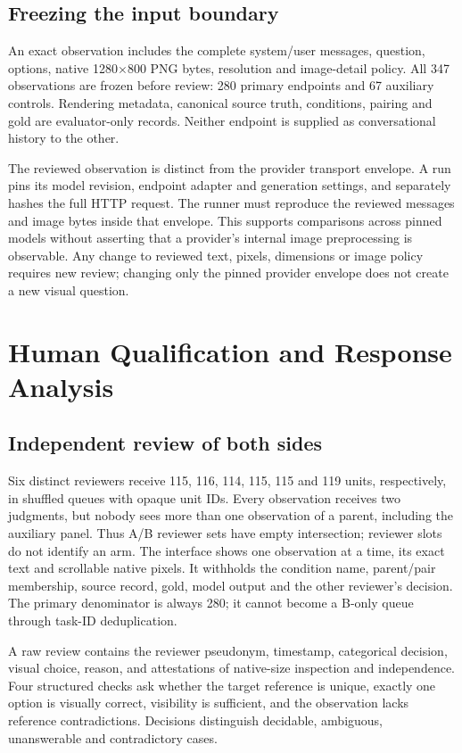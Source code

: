 \documentclass[10pt,twocolumn,letterpaper]{article}
\begin{document}
\subsection{Freezing the input boundary}
An exact observation includes the complete system/user messages,
question, options, native 1280$\times$800 PNG bytes, resolution and
image-detail policy. All 347 observations are frozen before review:
280 primary endpoints and 67 auxiliary controls. Rendering metadata,
canonical source truth, conditions, pairing and gold are evaluator-only
records. Neither endpoint is supplied as conversational history to the
other.

The reviewed observation is distinct from the provider transport
envelope. A run pins its model revision, endpoint adapter and generation
settings, and separately hashes the full HTTP request. The runner must
reproduce the reviewed messages and image bytes inside that envelope.
This supports comparisons across pinned models without asserting
that a provider's internal image preprocessing is observable. Any
change to reviewed text, pixels, dimensions or image policy requires
new review; changing only the pinned provider envelope does not create
a new visual question.

\section{Human Qualification and Response Analysis}
\subsection{Independent review of both sides}
Six distinct reviewers receive 115, 116, 114, 115, 115 and 119 units,
respectively, in shuffled queues with opaque unit IDs. Every observation
receives two judgments, but nobody sees more than one observation of
a parent, including the auxiliary panel. Thus A/B reviewer sets have
empty intersection; reviewer slots do not identify an arm. The interface
shows one observation at a time, its exact text and scrollable native
pixels. It withholds the condition name, parent/pair membership,
source record, gold, model output and the other reviewer's decision.
The primary denominator is always 280; it cannot become a B-only
queue through task-ID deduplication.

A raw review contains the reviewer pseudonym, timestamp, categorical
decision, visual choice, reason, and attestations of native-size
inspection and independence. Four structured checks ask whether
the target reference is unique, exactly one option is visually correct,
visibility is sufficient, and the observation lacks reference
contradictions. Decisions distinguish decidable, ambiguous,
unanswerable and contradictory cases.
\end{document}
